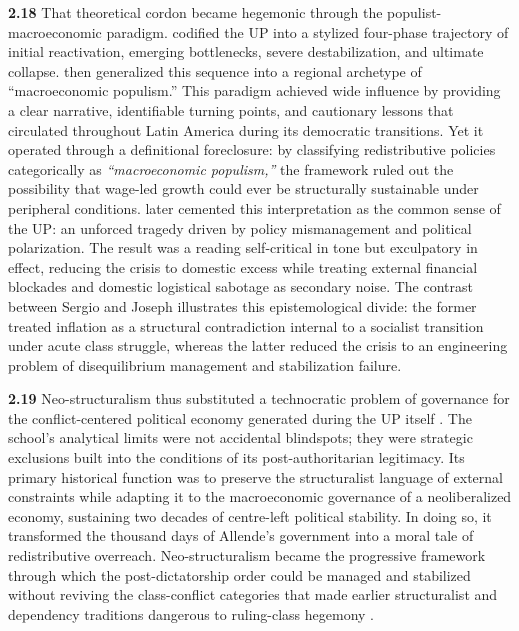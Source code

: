 \textbf{2.18} That theoretical cordon became hegemonic through the populist-macroeconomic paradigm. 
\citet{LarrainMeller1991} codified the UP into a stylized four-phase trajectory of initial reactivation, 
emerging bottlenecks, severe destabilization, and ultimate collapse. \citet{DornbuschEdwards1991} then 
generalized this sequence into a regional archetype of ``macroeconomic populism.'' This paradigm achieved 
wide influence by providing a clear narrative, identifiable turning points, and cautionary lessons that 
circulated throughout Latin America during its democratic transitions. Yet it operated through a 
definitional foreclosure: by classifying redistributive policies categorically as \textit{``macroeconomic 
populism,''} the framework ruled out the possibility that wage-led growth could ever be structurally 
sustainable under peripheral conditions. \citet{Meller2000} later cemented this interpretation as 
the common sense of the UP: an unforced tragedy driven by policy mismanagement and political polarization. 
The result was a reading self-critical in tone but exculpatory in effect, reducing the crisis to domestic 
excess while treating external financial blockades and domestic logistical sabotage as secondary noise. 
The contrast between Sergio \citet{RamosSergio1979} and Joseph \citet{RamosJoseph1980} illustrates this epistemological 
divide: the former treated inflation as a structural contradiction internal to a socialist transition 
under acute class struggle, whereas the latter reduced the crisis to an engineering problem of disequilibrium 
management and stabilization failure.

\textbf{2.19} Neo-structuralism thus substituted a technocratic problem of governance for the 
conflict-centered political economy generated during the UP itself \citep{LarrainMeller1991,DornbuschEdwards1991,Meller2000}. 
The school's analytical limits were not accidental blindspots; they were strategic exclusions built 
into the conditions of its post-authoritarian legitimacy. Its primary historical function was to 
preserve the structuralist language of external constraints while adapting it to the macroeconomic 
governance of a neoliberalized economy, sustaining two decades of centre-left political stability. In 
doing so, it transformed the thousand days of Allende's government into a moral tale of redistributive 
overreach. Neo-structuralism became the progressive framework through which the post-dictatorship order  could be managed and stabilized without reviving the class-conflict categories that made earlier structuralist and dependency traditions dangerous to ruling-class hegemony \citep{Leiva2008}.

